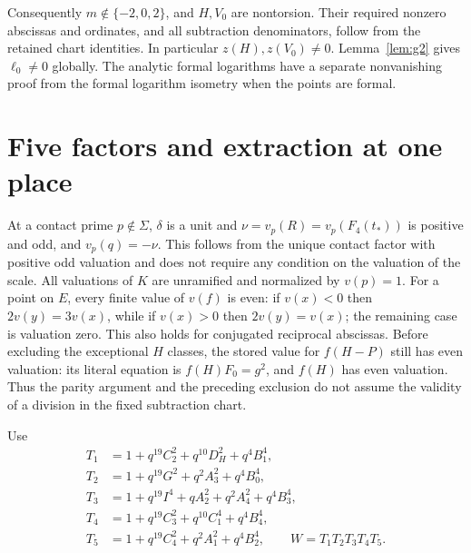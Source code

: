 \documentclass[11pt,a4paper]{article}
\begin{document}
Consequently $m\notin\{-2,0,2\}$, and $H,V_0$ are nontorsion. Their required
nonzero abscissas and ordinates, and all subtraction denominators,
follow from the retained chart identities. In particular
$z(H),z(V_0)\ne0$. Lemma~\ref{lem:g2} gives $\ell_0\ne0$ globally.
The analytic formal logarithms have a separate nonvanishing proof
from the formal logarithm isometry when the points are formal.

\section{Five factors and extraction at one place}
At a contact prime $p\notin\Sigma$, $\delta$ is a unit and
$\nu=v_p(R)=v_p(F_4(t_*))$ is positive and odd, and $v_p(q)=-\nu$. This follows
from the unique contact factor with positive odd valuation and
does not require any condition on the valuation of the scale. All valuations
of $K$ are unramified and normalized by $v(p)=1$.
For a point on $E$, every finite value of $v(f)$ is even: if
$v(x)<0$ then $2v(y)=3v(x)$, while if $v(x)>0$ then
$2v(y)=v(x)$; the remaining case is valuation zero.
This also holds for conjugated reciprocal abscissas. Before excluding
the exceptional $H$ classes, the stored value for $f(H-P)$ still has even
valuation: its literal equation is $f(H)F_0=g^2$, and $f(H)$ has even
valuation. Thus the parity argument and the preceding exclusion do not
assume the validity of a division in the fixed subtraction chart.

Use
\begin{align*}
 T_1&=1+q^{19}C_2^2+q^{10}D_H^2+q^4B_1^4,\\
 T_2&=1+q^{19}G^2+q^2A_3^2+q^4B_0^4,\\
 T_3&=1+q^{19}I^4+qA_2^2+q^2A_4^2+q^4B_3^4,\\
 T_4&=1+q^{19}C_3^2+q^{10}C_1^4+q^4B_4^4,\\
 T_5&=1+q^{19}C_4^2+q^2A_1^2+q^4B_2^4,
 \qquad W=T_1T_2T_3T_4T_5.
\end{align*}
\end{document}
